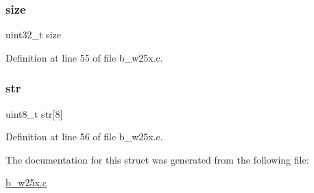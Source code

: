 \subsubsection{\texorpdfstring{size}{size}}
{\footnotesize\ttfamily uint32\+\_\+t size}



Definition at line 55 of file b\+\_\+w25x.\+c.

\mbox{\label{structb_w25_x___info__t_ac3d68b06876e51e9e7a74e389c73b09c}} 
\subsubsection{\texorpdfstring{str}{str}}
{\footnotesize\ttfamily uint8\+\_\+t str\mbox{[}8\mbox{]}}



Definition at line 56 of file b\+\_\+w25x.\+c.



The documentation for this struct was generated from the following file\+:\begin{DoxyCompactItemize}
\item 
\mbox{\hyperlink{b__w25x_8c}{b\+\_\+w25x.\+c}}\end{DoxyCompactItemize}
